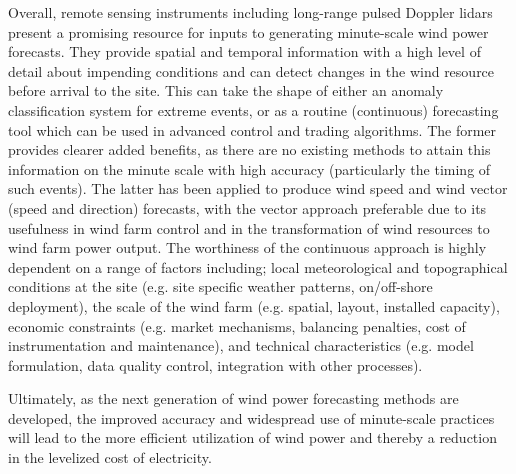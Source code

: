 Overall, remote sensing instruments including long-range pulsed Doppler lidars present a promising resource for inputs to generating minute-scale wind power forecasts. They provide spatial and temporal information with a high level of detail about impending conditions and can detect changes in the wind resource before arrival to the site. This can take the shape of either an anomaly classification system for extreme events, or as a routine (continuous) forecasting tool which can be used in advanced control and trading algorithms. The former provides clearer added benefits, as there are no existing methods to attain this information on the minute scale with high accuracy (particularly the timing of such events). The latter has been applied to produce wind speed and wind vector (speed and direction) forecasts, with the vector approach preferable due to its usefulness in wind farm control and in the transformation of wind resources to wind farm power output. The worthiness of the continuous approach is highly dependent on a range of factors including; local meteorological and topographical conditions at the site (e.g. site specific weather patterns, on/off-shore deployment), the scale of the wind farm (e.g. spatial, layout, installed capacity), economic constraints (e.g. market mechanisms, balancing penalties, cost of instrumentation and maintenance), and technical characteristics (e.g. model formulation, data quality control, integration with other processes). 

Ultimately, as the next generation of wind power forecasting methods are developed, the improved accuracy and widespread use of minute-scale practices will lead to the more efficient utilization of wind power and thereby a reduction in the levelized cost of electricity.

